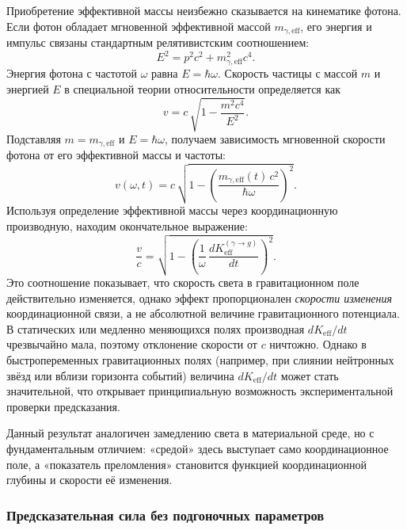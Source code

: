 \documentclass[12pt,a4paper]{article}
\begin{document}
Приобретение эффективной массы неизбежно сказывается на кинематике фотона. Если фотон обладает мгновенной эффективной массой $m_{\gamma,\mathrm{eff}}$, его энергия и импульс связаны стандартным релятивистским соотношением:
\begin{equation}
	E^2 = p^2 c^2 + m_{\gamma,\mathrm{eff}}^2 c^4.
\end{equation}
Энергия фотона с частотой $\omega$ равна $E = \hbar\omega$. Скорость частицы с массой $m$ и энергией $E$ в специальной теории относительности определяется как
\begin{equation}
	v = c\,\sqrt{1 - \frac{m^2 c^4}{E^2}}.
\end{equation}
Подставляя $m = m_{\gamma,\mathrm{eff}}$ и $E = \hbar\omega$, получаем зависимость мгновенной скорости фотона от его эффективной массы и частоты:
\begin{equation}
	\boxed{v(\omega, t) = c\,\sqrt{1 - \left(\frac{m_{\gamma,\mathrm{eff}}(t)\,c^2}{\hbar\omega}\right)^2}}.
\end{equation}
Используя определение эффективной массы через координационную производную, находим окончательное выражение:
\begin{equation}
	\frac{v}{c} = \sqrt{1 - \left(\frac{1}{\omega}\,\frac{dK_{\mathrm{eff}}^{(\gamma\to g)}}{dt}\right)^2}.
\end{equation}
Это соотношение показывает, что скорость света в гравитационном поле действительно изменяется, однако эффект пропорционален \emph{скорости изменения} координационной связи, а не абсолютной величине гравитационного потенциала. В статических или медленно меняющихся полях производная $dK_{\mathrm{eff}}/dt$ чрезвычайно мала, поэтому отклонение скорости от $c$ ничтожно. Однако в быстропеременных гравитационных полях (например, при слиянии нейтронных звёзд или вблизи горизонта событий) величина $dK_{\mathrm{eff}}/dt$ может стать значительной, что открывает принципиальную возможность экспериментальной проверки предсказания.

Данный результат аналогичен замедлению света в материальной среде, но с фундаментальным отличием: «средой» здесь выступает само координационное поле, а «показатель преломления» становится функцией координационной глубины и скорости её изменения.

\subsubsection{Предсказательная сила без подгоночных параметров}
\end{document}
